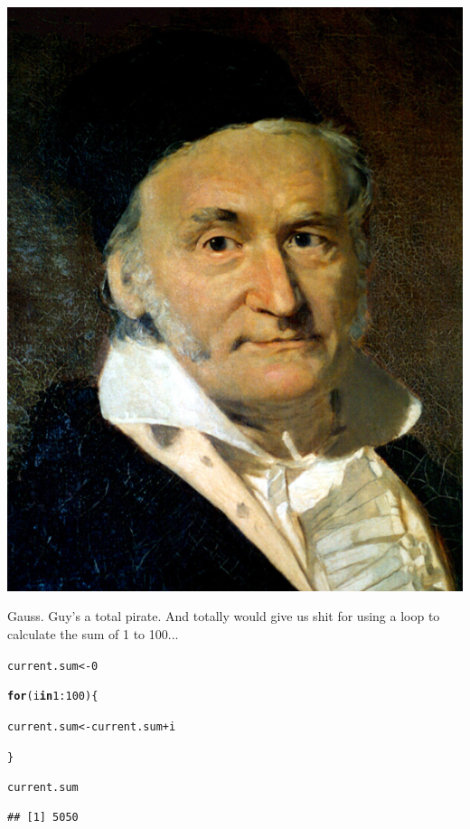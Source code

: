 \documentclass{tufte-book}\usepackage[]{graphicx}\usepackage[]{color}
\makeatletter
\newcommand{\hlnum}[1]{\textcolor[rgb]{0.686,0.059,0.569}{#1}}%
\newcommand{\hlopt}[1]{\textcolor[rgb]{0,0,0}{#1}}%
\newcommand{\hlstd}[1]{\textcolor[rgb]{0.345,0.345,0.345}{#1}}%
\newcommand{\hlkwa}[1]{\textcolor[rgb]{0.161,0.373,0.58}{\textbf{#1}}}%
\newcommand{\hlkwb}[1]{\textcolor[rgb]{0.69,0.353,0.396}{#1}}%
\newenvironment{kframe}{%
 \def\at@end@of@kframe{}%
 \ifinner\ifhmode%
  \def\at@end@of@kframe{\end{minipage}}%
  \begin{minipage}{\columnwidth}%
 \fi\fi%
 \def\FrameCommand##1{\hskip\@totalleftmargin \hskip-\fboxsep
 \colorbox{shadecolor}{##1}\hskip-\fboxsep
     \hskip-\linewidth \hskip-\@totalleftmargin \hskip\columnwidth}%
 \MakeFramed {\advance\hsize-\width
   \@totalleftmargin\z@ \linewidth\hsize
   \@setminipage}}%
 {\par\unskip\endMakeFramed%
 \at@end@of@kframe}
\newenvironment{knitrout}{}{} %
\makeatother
\begin{document}
\begin{marginfigure}
\includegraphics[width=\linewidth]{gauss.jpg}
\caption{Gauss. Guy's a total pirate. And totally would give us shit for using a loop to calculate the sum of 1 to 100...}

\end{marginfigure}

\begin{knitrout}
\color{fgcolor}\begin{kframe}
\begin{alltt}
\hlstd{current.sum} \hlkwb{<-} \hlnum{0}

\hlkwa{for}\hlstd{(i} \hlkwa{in} \hlnum{1}\hlopt{:}\hlnum{100}\hlstd{) \{}

 \hlstd{current.sum} \hlkwb{<-} \hlstd{current.sum} \hlopt{+} \hlstd{i}

\hlstd{\}}

\hlstd{current.sum}
\end{alltt}
\begin{verbatim}
## [1] 5050
\end{verbatim}
\end{kframe}
\end{knitrout}
\end{document}
